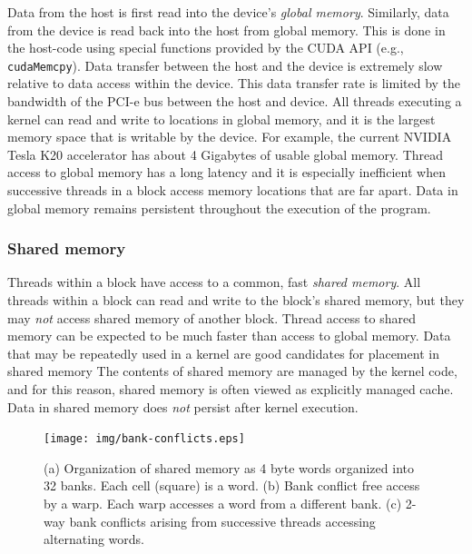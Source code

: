 Data from the host is first read into the
device's \emph{global memory}.
Similarly, data from the device is read back into the host
from global memory.
This is done in the host-code
using special functions provided by the CUDA API 
(e.g., \texttt{cudaMemcpy}).
Data transfer between the host and the device is
extremely slow relative to data access within the device.
This data transfer rate is limited by the bandwidth
of the PCI-e bus between the host and device.
All threads executing a kernel can
read and write to locations in global memory,
and it is the largest memory space that is
writable by the device.
For example, the current NVIDIA Tesla K20 accelerator
has about 4 Gigabytes of usable global memory.
Thread access to global memory has a long latency
and it is especially inefficient when
successive threads in a block access memory locations
that are far apart.
Data in global memory remains persistent
throughout the execution of the program.

\subsubsection{Shared memory}
\label{subsubsec:shared-memory}

Threads within a block have access to a
common, fast \emph{shared memory}.
All threads within a block
can read and write to the block's shared memory,
but they may \emph{not} access
shared memory of another block.
Thread access to shared memory can be expected to be
much faster than access to global memory.
Data that may be repeatedly used in a kernel
are good candidates for placement in shared memory
The contents of shared memory are managed by the kernel code,
and for this reason,
shared memory is often viewed as explicitly managed cache.
Data in shared memory does \emph{not} persist after
kernel execution.

\begin{figure}
\begin{center}
\texttt{[image: img/bank-conflicts.eps]}
\end{center}
\caption{(a) Organization of shared memory as 4 byte words
    organized into 32 banks. Each cell (square) is a word.
    (b) Bank conflict free access by a warp. Each warp
    accesses a word from a different bank. (c) 2-way
    bank conflicts arising from successive threads accessing
alternating words.}
\label{fig:bank-conflicts}
\end{figure}

